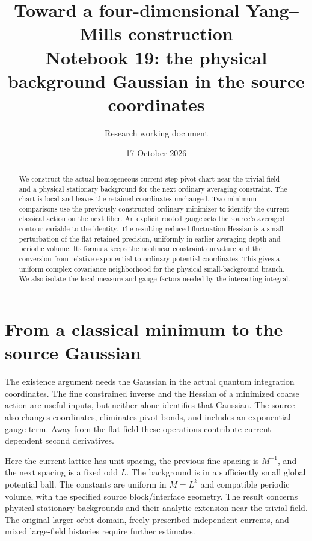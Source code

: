\documentclass[11pt]{article}
\title{Toward a four-dimensional Yang--Mills construction\\
\large Notebook 19: the physical background Gaussian in the source coordinates}
\author{Research working document}
\date{17 October 2026}
\theoremstyle{remark}
\begin{document}
\maketitle
\begin{abstract}
We construct the actual homogeneous current-step pivot chart near
the trivial field and a physical stationary background for the
next ordinary averaging constraint. The chart is local and leaves
the retained coordinates unchanged. Two minimum comparisons use
the previously constructed ordinary minimizer to identify the
current classical action on the next fiber. An explicit rooted
gauge sets the source's averaged contour variable to the identity.
The resulting reduced fluctuation Hessian is a small perturbation
of the flat retained precision, uniformly in earlier averaging
depth and periodic volume. Its formula keeps the nonlinear
constraint curvature and the conversion from relative exponential
to ordinary potential coordinates. This gives a uniform complex
covariance neighborhood for the physical small-background branch.
We also isolate the local measure and gauge factors needed by
the interacting integral.
\end{abstract}

\section{From a classical minimum to the source Gaussian}
\label{ps19-target}

The existence argument needs the Gaussian in the actual quantum
integration coordinates. The fine constrained inverse and the
Hessian of a minimized coarse action are useful inputs, but
neither alone identifies that Gaussian. The source also changes
coordinates, eliminates pivot bonds, and includes an exponential
gauge term. Away from the flat field these operations contribute
current-dependent second derivatives.

Here the current lattice has unit spacing, the previous fine
spacing is $M^{-1}$, and the next spacing is a fixed odd $L$.
The background is in a sufficiently small global potential ball.
The constants are uniform in $M=L^k$ and compatible periodic
volume, with the specified source block/interface geometry.
The result concerns physical stationary backgrounds and their
analytic extension near the trivial field. The original larger
orbit domain, freely prescribed independent currents, and mixed
large-field histories require further estimates.


\end{document}
